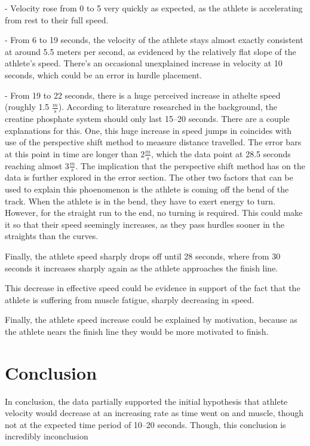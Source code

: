 \documentclass[index]{subfiles}
\begin{document}
- Velocity rose from 0 to 5 very quickly as expected, as the athlete is accelerating from rest to their full speed.

- From 6 to 19 seconds, the velocity of the athlete stays almost exactly consistent at around 5.5 meters per second, as evidenced by the relatively flat slope of the athlete's speed.  There's an occasional unexplained increase in velocity at 10 seconds, which could be an error in hurdle placement. 

- From 19 to 22 seconds, there is a huge perceived increase in athelte speed (roughly 1.5 \(\frac{m}{s}\)). According to literature researched in the background,  \parencite{martin1997better} the creatine phosphate system should only last 15--20 seconds. There are a couple explanations for this. One, this huge increase in speed jumps in coincides with use of the perspective shift method to measure distance travelled. The error bars at this point in time are longer than \(2\frac{m}{s}\), which the data point at 28.5 seconds reaching almost \(3\frac{m}{s}\). The implication that the perspective shift method has on the data is further explored in the error section. The other two factors that can be used to explain this phoenomenon is the athlete is coming off the bend of the track. When the athlete is in the bend, they have to exert energy to turn. However, for the straight run to the end, no turning is required. This could make it so that their speed seemingly increases, as they pass hurdles sooner in the straights than the curves. 


Finally, the athlete speed sharply drops off until 28 seconds, where from 30 seconds it increases sharply again as the athlete approaches the finish line. 

This decrease in effective speed could be evidence in support of the fact that the athlete is suffering from muscle fatigue, sharply decreasing in speed. 

Finally, the athlete speed increase could be explained by motivation, because as the athlete nears the finish line they would be more motivated to finish. 


\section{Conclusion}

In conclusion, the data partially supported the initial hypothesis that athlete velocity would decrease at an increasing rate as time went on and muscle, though not at the expected time period of 10--20 seconds. Though, this conclusion is incredibly inconclusion
\end{document}
